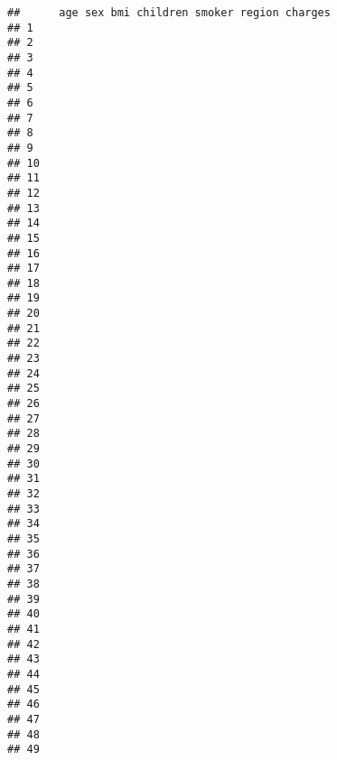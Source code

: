\documentclass[
]{article}
\begin{document}
\begin{verbatim}
##      age sex bmi children smoker region charges
## 1                                              
## 2                                              
## 3                                              
## 4                                              
## 5                                              
## 6                                              
## 7                                              
## 8                                              
## 9                                              
## 10                                             
## 11                                             
## 12                                             
## 13                                             
## 14                                             
## 15                                             
## 16                                             
## 17                                             
## 18                                             
## 19                                             
## 20                                             
## 21                                             
## 22                                             
## 23                                             
## 24                                             
## 25                                             
## 26                                             
## 27                                             
## 28                                             
## 29                                             
## 30                                             
## 31                                             
## 32                                             
## 33                                             
## 34                                             
## 35                                             
## 36                                             
## 37                                             
## 38                                             
## 39                                             
## 40                                             
## 41                                             
## 42                                             
## 43                                             
## 44                                             
## 45                                             
## 46                                             
## 47                                             
## 48                                             
## 49                                             

\end{verbatim}
\end{document}
